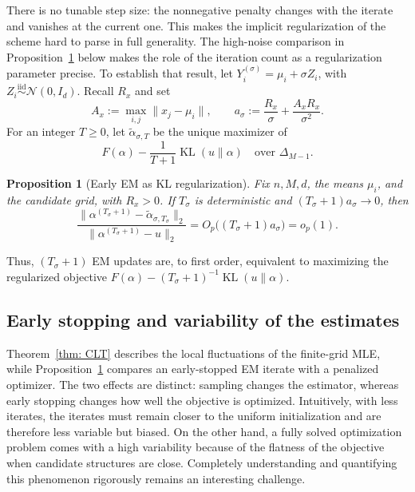 \documentclass[12pt]{iopart}
\newtheorem{prop}{Proposition}
\theoremstyle{remark}
\begin{document}
There is no tunable step size: the nonnegative penalty changes with the
iterate and vanishes at the current one. This makes the implicit regularization of the scheme hard to parse in full generality.
The high-noise comparison in Proposition~\ref{prop: EqReg} below
makes the role of the iteration count as a regularization parameter precise.
To establish that result, let $Y_i^{(\sigma)}=\mu_i+\sigma Z_i$, with
$Z_i\stackrel{\mathrm{iid}}{\sim}\mathcal N(0,I_d)$. Recall $R_x$ and set
\[
A_x:=\max_{i,j}\|x_j-\mu_i\|,
\qquad
a_\sigma:=\frac{R_x}{\sigma}+\frac{A_xR_x}{\sigma^2}.
\]
For an integer $T\geq0$, let $\widetilde\alpha_{\sigma,T}$ be the unique
maximizer of
\[
F(\alpha)-\frac1{T+1}\operatorname{KL}(u\|\alpha)
\quad\text{over }\Delta_{M-1}.
\]

\begin{prop}[Early EM as KL regularization]
\label{prop: EqReg}
Fix $n,M,d$, the means $\mu_i$, and the candidate grid, with
$R_x>0$. If $T_\sigma$ is deterministic and
$(T_\sigma+1)a_\sigma\to0$, then
\begin{equation}
\label{eq:empirical-em-regularization-rate}
\frac{\|\alpha^{(T_\sigma+1)}-
\widetilde\alpha_{\sigma,T_\sigma}\|_2}
{\|\alpha^{(T_\sigma+1)}-u\|_2}
=O_p\bigl((T_\sigma+1)a_\sigma\bigr)=o_p(1).
\end{equation}
\end{prop}
Thus, $(T_\sigma+1)$ EM updates are, to first order, equivalent to maximizing the regularized objective
$F(\alpha)-(T_\sigma+1)^{-1}\operatorname{KL}(u\|\alpha)$. 









\subsection{Early stopping and variability of the estimates}

Theorem~\ref{thm: CLT} describes the local fluctuations of the
finite-grid MLE, while  Proposition~\ref{prop: EqReg}  compares an
early-stopped EM iterate with a penalized optimizer.
The two effects are distinct: sampling changes the estimator, whereas
early stopping changes how well the objective is optimized. 
Intuitively, with less iterates, the iterates must remain closer to the uniform initialization and are therefore less variable but biased. 
On the other hand, a fully solved optimization problem comes with a high variability because of the flatness of the objective when candidate structures are close. 
Completely understanding and quantifying this phenomenon rigorously remains an interesting challenge.
\end{document}
